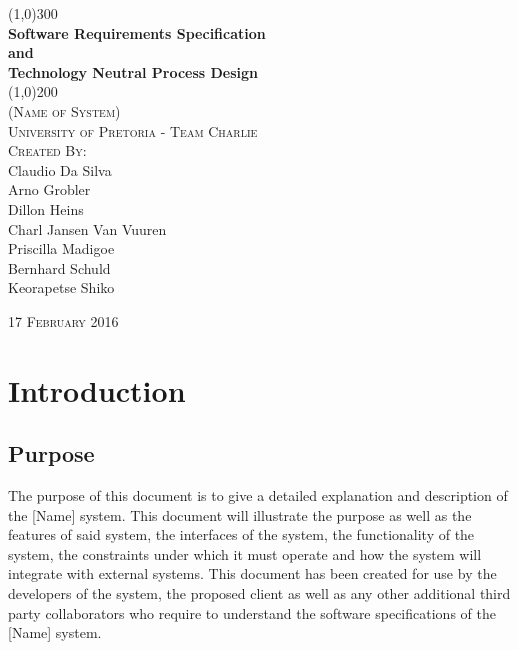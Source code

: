\documentclass{article}
\begin{document}
	\begin{titlepage}
		\begin{center}
		
			\line(1,0){300}\\
			[6mm]
			\huge{
				\bfseries Software Requirements Specification\\
				and\\
				Technology Neutral Process Design
			}\\
			[2mm]
			\line(1,0){200}\\
			[15mm]
			\textsc{\large (Name of System)}\\
			[7.5mm]
			\textsc{\large University of Pretoria - Team Charlie}\\
			[20mm]
			\textsc{\large Created By:}\\
			[2mm]
			\large{
				Claudio Da Silva\\
				Arno Grobler\\
				Dillon Heins\\
				Charl Jansen Van Vuuren\\
				Priscilla Madigoe\\
				Bernhard Schuld\\
				Keorapetse Shiko
			}\\
			[6cm]
		\end{center}
		
		\begin{flushright}
			\textsc{\large 17 February 2016}
		\end{flushright}
	\end{titlepage}
	
	\cleardoublepage
	\thispagestyle{empty}
	\tableofcontents
	
	\cleardoublepage
	\setcounter{page}{1}
	\section{Introduction}\label{sec:intro}
		\subsection{Purpose}\label{subsec:purpose}
			The purpose of this document is to give a detailed explanation and description of the [Name] system. This document will illustrate the purpose as well as the features of said system, the interfaces of the system, the functionality of the system, the constraints under which it must operate and how the system will integrate with external systems. This document has been created for use by the developers of the system, the proposed client as well as any other additional third party collaborators who require to understand the software specifications of the [Name] system.
		
\end{document}
